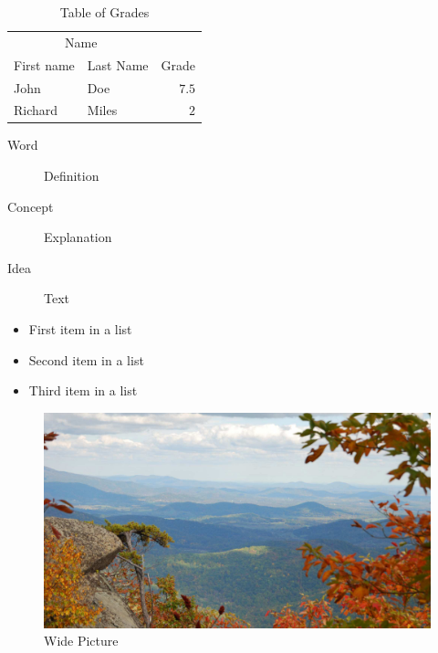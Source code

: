 \lipsum[11]

\begin{table}[hbt]
\caption{Table of Grades}
\centering
\begin{tabular}{llr}
\toprule
\multicolumn{2}{c}{Name} \\
\cmidrule(r){1-2}
First name & Last Name & Grade \\
\midrule
John & Doe & $7.5$ \\
Richard & Miles & $2$ \\
\bottomrule
\end{tabular}
\label{tab:label}
\end{table}

\begin{description}
\item[Word] Definition
\item[Concept] Explanation
\item[Idea] Text
\end{description}

\begin{itemize}[noitemsep] 
\item First item in a list
\item Second item in a list
\item Third item in a list
\end{itemize}

\begin{figure}[ht]\centering 
\includegraphics[width=\linewidth]{figures/view.jpg}
\caption{Wide Picture}
\label{fig:view}
\end{figure}